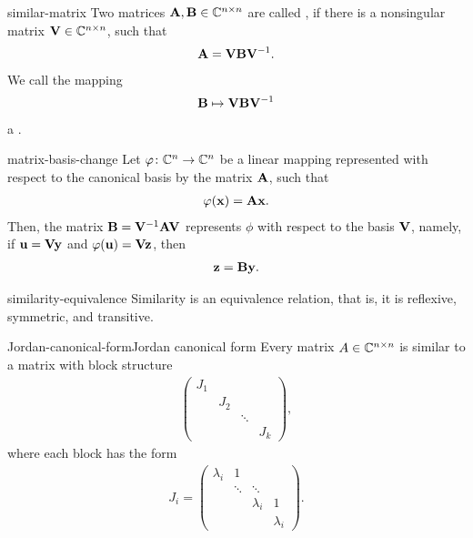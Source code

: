 \begin{Definition}{similar-matrix}
  Two matrices $\mathbf A,\mathbf B\in\mathbb C^{n\times n}$ are called , if there is a nonsingular matrix $\mathbf V\in\mathbb C^{n\times n}$, such that
  \begin{gather}
      \mathbf A = \mathbf V \mathbf B \mathbf V^{-1}.
  \end{gather}
  We call the mapping
  \begin{gather}
      \mathbf B \mapsto \mathbf V \mathbf B \mathbf V^{-1}
  \end{gather}
  a .
\end{Definition}

\begin{Lemma}{matrix-basis-change}
  Let $\varphi\colon \mathbb C^n\to \mathbb C^n$ be a linear mapping represented with
  respect to the canonical basis by the matrix $\mathbf A$, such that
  \begin{gather}
    \varphi(\mathbf x) = \mathbf A \mathbf x.
  \end{gather}
  Then, the matrix $\mathbf B = \mathbf V^{-1}\mathbf A\mathbf V$ represents $\phi$
  with respect to the basis $\mathbf V$, namely, if $\mathbf u = \mathbf V \mathbf y$ and
  $\varphi(\mathbf u) = \mathbf V \mathbf z$, then
  \begin{gather}
    \mathbf z = \mathbf B \mathbf y.
  \end{gather}
\end{Lemma}

\begin{Lemma}{similarity-equivalence}
  Similarity is an equivalence relation, that is, it is reflexive,
  symmetric, and transitive.
\end{Lemma}

\begin{Theorem*}{Jordan-canonical-form}{Jordan canonical form}
  Every matrix $A\in\mathbb C^{n\times n}$ is similar to a matrix with block structure
  \begin{gather}
    \begin{pmatrix}
      J_1\\&J_2\\&&\ddots\\&&&J_k
    \end{pmatrix},
  \end{gather}
  where each block has the form
  \begin{gather}
    J_i = \begin{pmatrix}
      \lambda_i&1\\&\ddots&\ddots\\
      &&\lambda_i&1\\
      &&&\lambda_i
    \end{pmatrix}.
  \end{gather}
\end{Theorem*}


